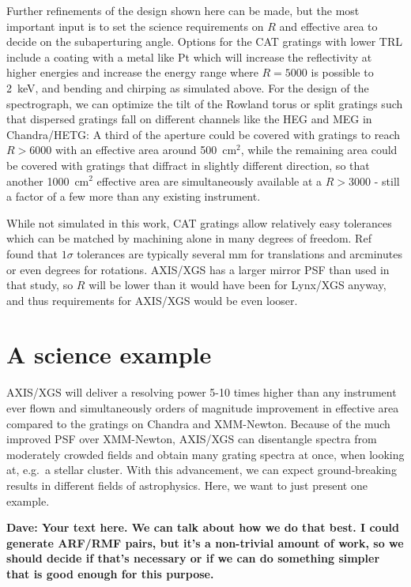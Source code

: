 \documentclass[12pt]{spieman}  %
\begin{document}
\begin{spacing}{1}
Further refinements of the design shown here can be made, but the most important input is to set the science requirements on $R$ and effective area to decide on the subaperturing angle. Options for the CAT gratings with lower TRL include a coating with a metal like Pt which will increase the reflectivity at higher energies and increase the energy range where $R=5000$ is possible to 2~keV, and bending and chirping as simulated above. For the design of the spectrograph, we can optimize the tilt of the Rowland torus or split gratings such that dispersed gratings fall on different channels like the HEG and MEG in Chandra/HETG\cite{2005PASP..117.1144C}: A third of the aperture could be covered with gratings to reach $R>6000$ with an effective area around 500~cm$^2$, while the remaining area could be covered with gratings that diffract in slightly different direction, so that another 1000~cm$^2$ effective area are simultaneously available at a $R>3000$ - still a factor of a few more than any existing instrument.

While not simulated in this work, CAT gratings allow relatively easy tolerances which can be matched by machining alone in many degrees of freedom. Ref~ found that $1\sigma$ tolerances are typically several mm for translations and arcminutes or even degrees for rotations. AXIS/XGS has a larger mirror PSF than used in that study, so $R$ will be lower than it would have been for Lynx/XGS\cite{10.1117/1.JATIS.5.2.021003} anyway, and thus requirements for AXIS/XGS would be even looser.


\section{A science example}
AXIS/XGS will deliver a resolving power 5-10 times higher than any instrument ever flown and simultaneously orders of magnitude improvement in effective area compared to the gratings on Chandra and XMM-Newton. Because of the much improved PSF over XMM-Newton, AXIS/XGS can disentangle spectra from moderately crowded fields and obtain many grating spectra at once, when looking at, e.g.\ a stellar cluster.
With this advancement, we can expect ground-breaking results in different fields of astrophysics. Here, we want to just present one example.

\textbf{Dave: Your text here. We can talk about how we do that best. I could generate ARF/RMF pairs, but it's a non-trivial amount of work, so we should decide if that's necessary or if we can do something simpler that is good enough for this purpose.}


\end{spacing}
\end{document}
